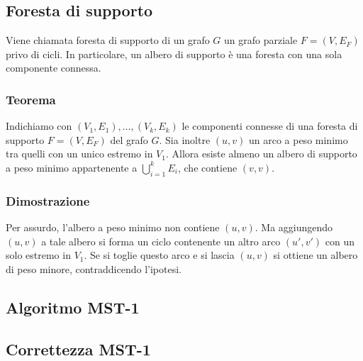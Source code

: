 \documentclass[../template]{subfiles}
\begin{document}
\subsection{Foresta di supporto}
Viene chiamata foresta di supporto di un grafo $G$ un grafo parziale $F = (V, E_F)$ privo di cicli. In particolare, un albero di
supporto è una foresta con una sola componente connessa.

\subsubsection{Teorema}
Indichiamo con $(V_1, E_1),\ldots ,(V_k, E_k)$ le componenti connesse di una foresta di supporto
$F = (V, E_F)$ del grafo $G$. Sia inoltre $(u, v)$ un arco a peso minimo tra quelli con un unico estremo
in $V_1$. Allora esiste almeno un albero di supporto a peso minimo appartenente a $\bigcup^k_{i=1} E_i$,
che contiene $(v, v)$.

\subsubsection{Dimostrazione}
Per assurdo, l'albero a peso minimo non contiene $(u, v)$. Ma aggiungendo $(u, v)$ a tale albero si forma un
ciclo contenente un altro arco $(u', v')$  con un solo estremo in $V_1$.
Se si toglie questo arco e si lascia $(u, v)$ si ottiene un albero di peso minore,
contraddicendo l'ipotesi.

\subsection{Algoritmo MST-1}
\begin{center}
\end{center}


\subsection{Correttezza MST-1}
\end{document}
